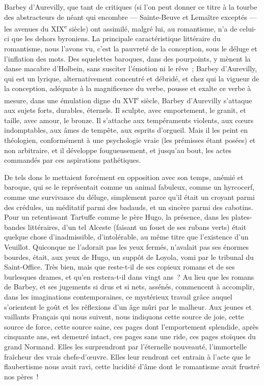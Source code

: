 \documentclass[french,twoside]{book} %
\begin{document}
Barbey d’Aurevilly, que tant de critiques (si l’on peut donner ce titre à la tourbe des abstracteurs de néant qui encombre — Sainte-Beuve et Lemaître exceptés — les avenues du XIX\textsuperscript{e} siècle) ont assimilé, malgré lui, au romantisme, n’a de celui-ci que les dehors byroniens. La principale caractéristique littéraire du romantisme, nous l’avons vu, c’est la pauvreté de la conception, sous le déluge et l’inflation des mots. Des squelettes baroques, dans des pourpoints, y mènent la danse macabre d’Holbein, sans susciter l’émotion ni le rêve ; Barbey d’Aurevilly, qui est un lyrique, alternativement concentré et débridé, et chez qui la vigueur de la conception, adéquate à la magnificence du verbe, pousse et exalte ce verbe à mesure, dans une émulation digne du XVI\textsuperscript{e} siècle, Barbey d’Aurevilly s’attaque aux sujets forts, durables, éternels. Il sculpte, avec emportement, le granit, et taille, avec amour, le bronze. Il s’attache aux tempéraments violents, aux cœurs indomptables, aux âmes de tempête, aux esprits d’orgueil. Mais il les peint en théologien, conformément à une psychologie vraie (les prémisses étant posées) et non arbitraire, et il développe fougueusement, et jusqu’au bout, les actes commandés par ces aspirations pathétiques.\par
De tels dons le mettaient forcément en opposition avec son temps, anémié et baroque, qui se le représentait comme un animal fabuleux, comme un hyrcocerf, comme une survivance du déluge, simplement parce qu’il était un croyant parmi des crédules, un méditatif parmi des badauds, et un sincère parmi des cabotins. Pour un retentissant Tartuffe comme le père Hugo, la présence, dans les plates-bandes littéraires, d’un tel Alceste (faisant un fouet de ses rubans verts) était quelque chose d’inadmissible, d’intolérable, au même titre que l’existence d’un Veuillot. Quiconque ne l’adorait pas les yeux fermés, n’avalait pas ses énormes bourdes, était, aux yeux de Hugo, un suppôt de Loyola, vomi par le tribunal du Saint-Office. Très bien, mais que reste-t-il de ses copieux romans et de ses burlesques drames, et qu’en restera-t-il dans vingt ans ? Au lieu que les romans de Barbey, et ses jugements si drus et si nets, assénés, commencent à accomplir, dans les imaginations contemporaines, ce mystérieux travail grâce auquel s’orientent le goût et les réflexions d’un âge mûri par le malheur. Aux jeunes et vaillants Français qui nous suivent, nous indiquons cette source de joie, cette source de force, cette source saine, ces pages dont l’emportement splendide, après cinquante ans, est demeuré intact, ces pages sans une ride, ces pages stoïques du grand Normand. Elles les surprendront par l’éternelle nouveauté, l’immortelle fraîcheur des vrais chefs-d’œuvre. Elles leur rendront cet entrain à l’acte que le flaubertisme nous avait ravi, cette lucidité d’âme dont le romantisme avait frustré nos pères !\par
\end{document}

